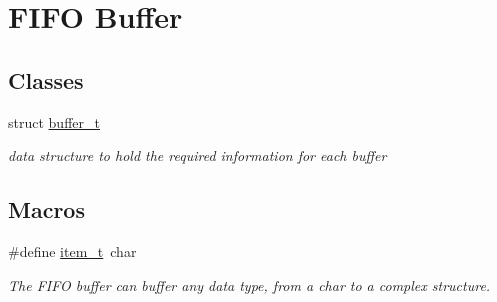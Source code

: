 \hypertarget{group__buffer}{\section{F\+I\+F\+O Buffer}
\label{group__buffer}
}
\subsection*{Classes}
\begin{DoxyCompactItemize}
\item 
struct \hyperlink{structbuffer__t}{buffer\+\_\+t}
\begin{DoxyCompactList}\small\item\em data structure to hold the required information for each buffer \end{DoxyCompactList}\end{DoxyCompactItemize}
\subsection*{Macros}
\begin{DoxyCompactItemize}
\item 
\#define \hyperlink{group__buffer_gad9732dcc12e8aa91d552188c72dea329}{item\+\_\+t}~char
\begin{DoxyCompactList}\small\item\em The F\+I\+F\+O buffer can buffer any data type, from a char to a complex structure. \end{DoxyCompactList}\end{DoxyCompactItemize}
